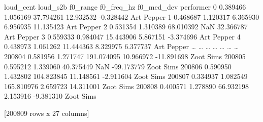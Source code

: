 \documentclass[letterpaper,10pt,english]{sphinxmanual}
\begin{document}
{\begin{sphinxVerbatim}[commandchars=\\\{\}]
        loud\_cent  loud\_s2b    f0\_range  f0\_freq\_hz  f0\_med\_dev   performer
0        0.389466  1.056169   37.794261   12.932532   -0.328442  Art Pepper
1        0.468687  1.120317    6.365930    6.956935   11.135423  Art Pepper
2        0.531354  1.310389   68.010392         NaN   32.366787  Art Pepper
3        0.559333  0.984047   15.443906    5.867151   -3.374696  Art Pepper
4        0.438973  1.061262   11.444363    8.329975    6.377737  Art Pepper
{\ldots}           {\ldots}       {\ldots}         {\ldots}         {\ldots}         {\ldots}         {\ldots}
200804   0.581956  1.271747  191.074095   10.966972  -11.891698   Zoot Sims
200805   0.595212  1.339060   40.375449         NaN  -99.173779   Zoot Sims
200806   0.590950  1.432802  104.823845   11.148561   -2.911604   Zoot Sims
200807   0.334937  1.082549  165.810976    2.659723   14.311001   Zoot Sims
200808   0.400571  1.278890   66.932198    2.153916   -9.381310   Zoot Sims

[200809 rows x 27 columns]
\end{sphinxVerbatim}
}

{
\begin{sphinxVerbatim}[commandchars=\\\{\}]
\llap{\color{nbsphinxin}[43]:\,\hspace{\fboxrule}\hspace{\fboxsep}}
\end{sphinxVerbatim}
}
\end{document}
